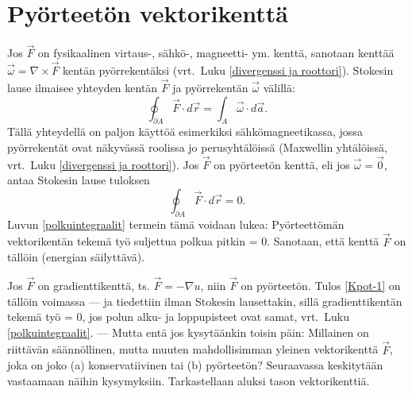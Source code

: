 \section{Pyörteetön vektorikenttä} \label{pyörteetön vektorikenttä}
\alku
{}

Jos $\vec F$ on fysikaalinen virtaus-, sähkö-, magneetti- ym. kenttä, sanotaan kenttää
$\vec \omega=\nabla\times\vec F$ kentän pyörrekentäksi (vrt.\ Luku 
\ref{divergenssi ja roottori}). Stokesin lause ilmaisee yhteyden kentän $\vec F$ ja pyörrekentän
$\vec\omega$ välillä:
\[
\oint_{\partial A} \vec F\cdot d\vec r=\int_A \vec\omega\cdot d\vec a.
\]
Tällä yhteydellä on paljon käyttöä esimerkiksi sähkömagneetikassa, jossa pyörrekentät ovat 
näkyvässä roolissa jo perusyhtälöissä (Maxwellin yhtälöissä, vrt.\ Luku 
\ref{divergenssi ja roottori}). Jos $\vec F$ on pyörteetön kenttä, eli jos $\vec\omega=\vec 0$,
antaa Stokesin lause tuloksen
\begin{equation} \label{Kpot-1}
\oint_{\partial A} \vec F\cdot d\vec r=0.
\end{equation}
Luvun \ref{polkuintegraalit} termein tämä voidaan lukea: Pyörteettömän vektorikentän tekemä työ
suljettua polkua pitkin = 0. Sanotaan, että kenttä $\vec F$ on tällöin
 (energian säilyttävä).

Jos $\vec F$ on gradienttikenttä, ts. $\vec F=-\nabla u$, niin $\vec F$ on pyörteetön. Tulos 
\eqref{Kpot-1} on tällöin voimassa --- ja tiedettiin ilman Stokesin lausettakin, sillä 
gradienttikentän tekemä työ = 0, jos polun alku- ja loppupisteet ovat samat, vrt.\ Luku 
\ref{polkuintegraalit}. --- Mutta entä jos kysytäänkin toisin päin: Millainen on riittävän 
säännöllinen, mutta muuten mahdollisimman yleinen vektorikenttä $\vec F$, joka on joko (a)
konservatiivinen tai (b) pyörteetön? Seuraavassa keskitytään vastaamaan näihin kysymyksiin. 
Tarkastellaan aluksi tason vektorikenttiä.

